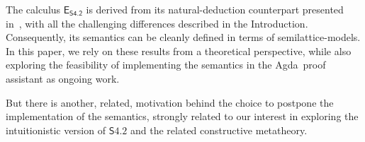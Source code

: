 \documentclass{article}
\newcommand{\logic}{\mathsf{S4.2}}
\newcommand{\commento}[1]{}
\newcommand{\eseq}{\mathsf{E}_{{\textsf{S4.2}}}}
\newcommand{\agda}{\textsf{Agda}}
\theoremstyle{definition}
\begin{document}
{The calculus $\eseq$ is derived from its natural-deduction counterpart presented in~\cite{Martini2024:S42NaturalDeduction}, with all the challenging differences described in the Introduction. Consequently, its semantics can be cleanly defined in terms of semilattice-models. In this paper, we rely on these results from a theoretical perspective, while also exploring the feasibility of implementing the semantics in the \agda\ proof assistant as ongoing work.

\commento{It is well known from the literature, that formalisation and metaproperties of sequent calculi and natural deduction are not ``plainly interchangeable''}

But there is another, related, motivation behind the choice to postpone the implementation of the semantics, strongly related to our interest in exploring the intuitionistic version of $\logic$ and the related constructive metatheory.

}
\end{document}
